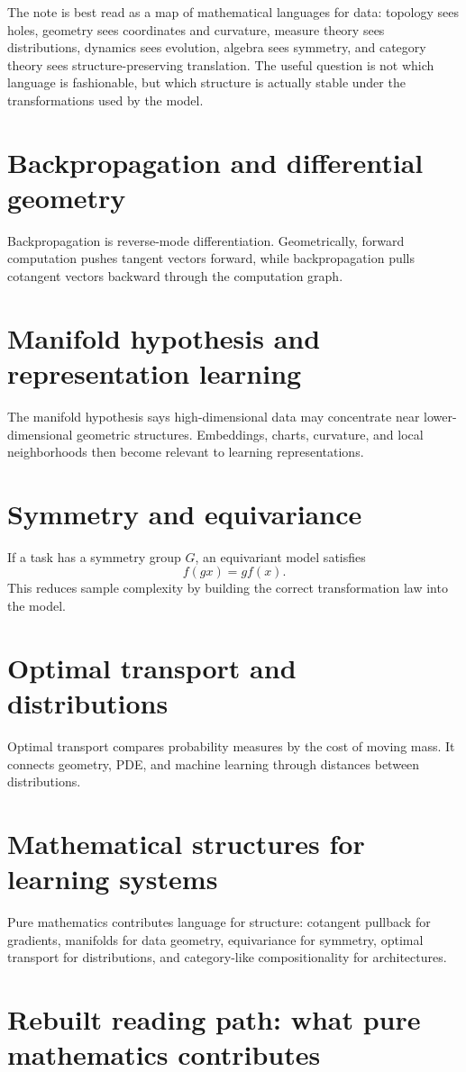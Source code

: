The note is best read as a map of mathematical languages for data: topology sees holes, geometry sees coordinates and curvature, measure theory sees distributions, dynamics sees evolution, algebra sees symmetry, and category theory sees structure-preserving translation.  The useful question is not which language is fashionable, but which structure is actually stable under the transformations used by the model.

\section{Backpropagation and differential geometry}
Backpropagation is reverse-mode differentiation.  Geometrically, forward computation pushes tangent vectors forward, while backpropagation pulls cotangent vectors backward through the computation graph.
\section{Manifold hypothesis and representation learning}
The manifold hypothesis says high-dimensional data may concentrate near lower-dimensional geometric structures.  Embeddings, charts, curvature, and local neighborhoods then become relevant to learning representations.
\section{Symmetry and equivariance}
If a task has a symmetry group \(G\), an equivariant model satisfies
\[
f(gx)=g f(x).
\]
This reduces sample complexity by building the correct transformation law into the model.
\section{Optimal transport and distributions}
Optimal transport compares probability measures by the cost of moving mass.  It connects geometry, PDE, and machine learning through distances between distributions.
\section{Mathematical structures for learning systems}
Pure mathematics contributes language for structure: cotangent pullback for gradients, manifolds for data geometry, equivariance for symmetry, optimal transport for distributions, and category-like compositionality for architectures.

\section{Rebuilt reading path: what pure mathematics contributes}


